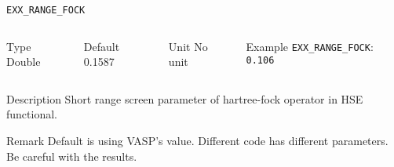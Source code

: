 \documentclass[xcolor=dvipsnames,t]{beamer}
\begin{document}
\begin{frame}[allowframebreaks]{\texttt{EXX\_RANGE\_FOCK}} \label{EXX_RANGE_FOCK}
\vspace*{-12pt}
\begin{columns}
\begin{block}{Type}
Double
\end{block}

\begin{block}{Default}
0.1587
\end{block}

\begin{block}{Unit}
No unit
\end{block}

\begin{block}{Example}
\texttt{EXX\_RANGE\_FOCK}: \texttt{0.106}
\end{block}
\end{columns}

\begin{block}{Description}
Short range screen parameter of hartree-fock operator in HSE functional. 
\end{block}

\begin{block}{Remark}
Default is using VASP's value. Different code has different parameters. Be careful with the results. 
\end{block}

\end{frame}
\end{document}
